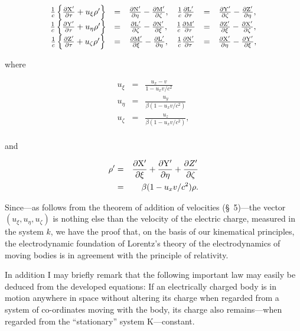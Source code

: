 \documentclass{article}
\newcommand{\dd}[2]{\frac{\partial #1}{\partial #2}}
\newcommand{\ic}{\frac{1}{c}}
\begin{document}
\renewcommand{\arraystretch}{1.5}
{\Large
\[
\begin{array}{cccccc}
\ic\left\{\dd{\rm X'}{\tau}+u_\xi\rho'\right\} & = & \dd{\rm N'}{\eta} - \dd{\rm M'}{\zeta},
 & \ic\dd{\rm L'}{\tau} & = & \dd{\rm Y'}{\zeta} - \dd{\rm Z'}{\eta}, \\
\ic\left\{\dd{\rm Y'}{\tau}+u_\eta\rho'\right\} & = & \dd{\rm L'}{\zeta} - \dd{\rm N'}{\xi},
 & \ic\dd{\rm M'}{\tau} & = & \dd{\rm Z'}{\xi} - \dd{\rm X'}{\zeta}, \\
\ic\left\{\dd{\rm Z'}{\tau}+u_\zeta\rho'\right\} & = & \dd{\rm M'}{\xi} - \dd{\rm L'}{\eta},
 & \ic\dd{\rm N'}{\tau} & = & \dd{\rm X'}{\eta} - \dd{\rm Y'}{\xi}, \\
\end{array}
\]
}
\renewcommand{\arraystretch}{1}

\noindent
where

\begin{eqnarray*}
u_\xi & = & \frac{u_x-v}{1-u_xv/c^2} \\
u_\eta & = & \frac{u_y}{\beta(1-u_xv/c^2)} \\
u_\zeta & = & \frac{u_z}{\beta(1-u_xv/c^2)}, \\
\end{eqnarray*}

\noindent
and

\begin{eqnarray*}
\rho' & = & \dd{\rm X'}{\xi}+\dd{\rm Y'}{\eta}+\dd{Z'}{\zeta} \\
 & = & \beta(1-u_xv/c^2)\rho.
\end{eqnarray*}

\noindent
Since---as follows from the theorem of addition of velocities (\S\ 5)---the
vector $(u_\xi, u_\eta, u_\zeta)$ is nothing else than the velocity of the electric
charge, measured in the system $k$, we have the proof that, on the basis
of our kinematical principles, the electrodynamic foundation of
Lorentz's theory of the electrodynamics of moving bodies is in
agreement with the principle of relativity.

In addition I may briefly remark that the following important law may
easily be deduced from the developed equations: If an electrically
charged body is in motion anywhere in space without altering its
charge when regarded from a system of co-ordinates moving with the
body, its charge also remains---when regarded from the ``stationary''
system K---constant.

\end{document}
